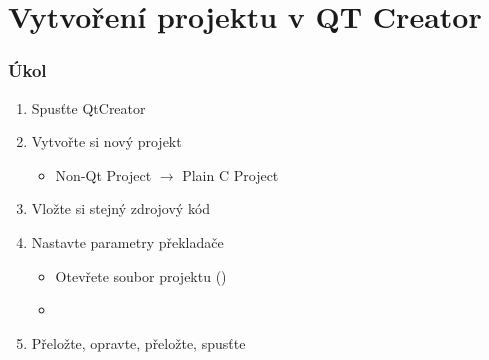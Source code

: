 \section{Vytvoření projektu v QT Creator}
\frame{\sectionpage}

\begin{frame}
  \frametitle{Úkol}

  \begin{enumerate}
    \item Spusťte QtCreator
    \item Vytvořte si nový projekt
    \begin{itemize}
      \item Non-Qt Project $\rightarrow$ Plain C Project
    \end{itemize}

    \item Vložte si stejný zdrojový kód
    \item Nastavte parametry překladače
    \begin{itemize}
      \item Otevřete soubor projektu ()
      \item {}
    \end{itemize}

    \item Přeložte, opravte, přeložte, spusťte

  \end{enumerate}

\end{frame}



